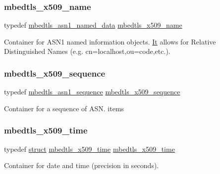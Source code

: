 \subsubsection{\texorpdfstring{mbedtls\+\_\+x509\+\_\+name}{mbedtls\_x509\_name}}
{\footnotesize\ttfamily typedef \hyperlink{structmbedtls__asn1__named__data}{mbedtls\+\_\+asn1\+\_\+named\+\_\+data} \hyperlink{group__x509__module_ga2272228c7776102328df31623af3168c}{mbedtls\+\_\+x509\+\_\+name}}

Container for A\+S\+N1 named information objects. \hyperlink{class_it}{It} allows for Relative Distinguished Names (e.\+g. cn=localhost,ou=code,etc.). \mbox{\label{group__x509__module_gabd52d60a09315854d9ef849d02154f35}} 
\subsubsection{\texorpdfstring{mbedtls\+\_\+x509\+\_\+sequence}{mbedtls\_x509\_sequence}}
{\footnotesize\ttfamily typedef \hyperlink{structmbedtls__asn1__sequence}{mbedtls\+\_\+asn1\+\_\+sequence} \hyperlink{group__x509__module_gabd52d60a09315854d9ef849d02154f35}{mbedtls\+\_\+x509\+\_\+sequence}}

Container for a sequence of A\+S\+N. items \mbox{\label{group__x509__module_ga38827540a02fb2ddca08ec0917a8a41b}} 
\subsubsection{\texorpdfstring{mbedtls\+\_\+x509\+\_\+time}{mbedtls\_x509\_time}}
{\footnotesize\ttfamily typedef \hyperlink{interfacestruct}{struct} \hyperlink{structmbedtls__x509__time}{mbedtls\+\_\+x509\+\_\+time}
 \hyperlink{structmbedtls__x509__time}{mbedtls\+\_\+x509\+\_\+time}}

Container for date and time (precision in seconds). \mbox{\label{group__x509__module_gacc3115587f8d882a7a137c38d6939e07}} 
